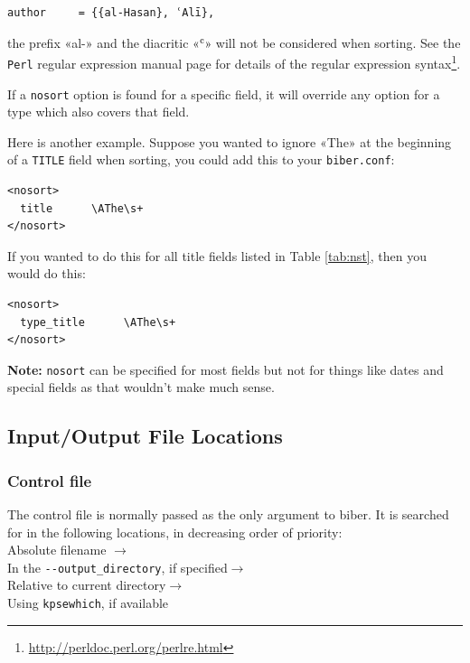 \documentclass{ltxdockit}
\begin{document}
\begin{verbatim}
author	   = {{al-Hasan}, ʿAlī},
\end{verbatim}

\noindent the prefix «al-» and the diacritic «ʿ» will not be considered
when sorting. See the \verb+Perl+ regular expression manual page for
details of the regular expression syntax\footnote{\url{http://perldoc.perl.org/perlre.html}}.

If a \verb+nosort+ option is found for a specific field, it will override
any option for a type which also covers that field.

Here is another example. Suppose you wanted to ignore «The» at the
beginning of a \verb+TITLE+ field when sorting, you could add this to your
\verb+biber.conf+:

\begin{verbatim}
<nosort>
  title      \AThe\s+
</nosort>
\end{verbatim}

\noindent If you wanted to do this for all title fields listed in Table
\ref{tab:nst}, then you would do this:

\begin{verbatim}
<nosort>
  type_title      \AThe\s+
</nosort>
\end{verbatim}

\noindent \textbf{Note:} \verb+nosort+ can be specified for most fields but
not for things like dates and special fields as that wouldn't make much sense.

\subsection{Input/Output File Locations}

\subsubsection{Control file}\label{loc:cf}

The control file is normally passed as the only argument to biber. It is
searched for in the following locations, in decreasing order of
priority:\\[2ex]

\noindent Absolute filename $\rightarrow$\\
\hspace*{1em}In the \verb+--output_directory+, if specified$\rightarrow$\\
\hspace*{2em}Relative to current directory$\rightarrow$\\
\hspace*{3em}Using \verb+kpsewhich+, if available
\end{document}
